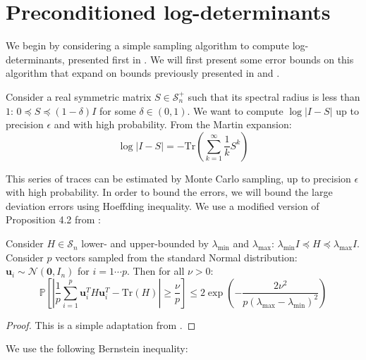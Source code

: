
\section{Preconditioned log-determinants\label{sec:Preconditioned-log-determinants}}

We begin by considering a simple sampling algorithm to compute log-determinants,
presented first in \cite{Barry1999}. We will first present some error
bounds on this algorithm that expand on bounds previously presented
in \cite{Bai1996} and \cite{Barry1999}.

Consider a real symmetric matrix $S\in\mathcal{S}_{n}^{+}$ such that
its spectral radius is less than $1$: $0\preceq S\preceq\left(1-\delta\right)I$
for some $\delta\in\left(0,1\right)$. We want to compute $\log\left|I-S\right|$
up to precision $\epsilon$ and with high probability. From the Martin
expansion: 
\begin{equation}
\log\left|I-S\right|=-\mbox{Tr}\left(\sum_{k=1}^{\infty}\frac{1}{k}S^{k}\right)\label{eq:martin}
\end{equation}


This series of traces can be estimated by Monte Carlo sampling, up
to precision $\epsilon$ with high probability. In order to bound
the errors, we will bound the large deviation errors using Hoeffding
inequality. We use a modified version of Proposition 4.2 from \cite{Bai1996}: 

\begin{lemma} \label{lem:hoeffding-trace}Consider $H\in\mathcal{S}_{n}$
lower- and upper-bounded by $\lambda_{\text{min}}$ and $\lambda_{\text{max}}$:
$\lambda_{\min}I\preceq H\preceq\lambda_{\max}I$. Consider $p$ vectors
sampled from the standard Normal distribution: $\mathbf{u}_{i}\sim\mathcal{N}\left(\mathbf{0},I_{n}\right)$
for $i=1\cdots p$. Then for all $\nu>0$: 
\[
\mathbb{P}\left[\left|\frac{1}{p}\sum_{i=1}^{p}\mathbf{u}_{i}^{T}H\mathbf{u}_{i}^{T}-\mbox{Tr}\left(H\right)\right|\geq\frac{\nu}{p}\right]\leq2\exp\left(-\frac{2\nu^{2}}{p\left(\lambda_{\max}-\lambda_{\min}\right)^{2}}\right)
\]
\end{lemma}

\begin{proof} This is a simple adaptation from \cite{Bai1996}. \end{proof}

We use the following Bernstein inequality:

